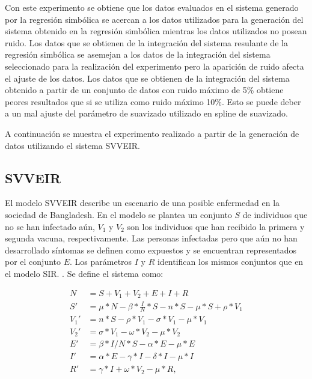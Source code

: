Con este experimento se obtiene que los datos evaluados en el sistema generado por la regresión simbólica se acercan a los datos utilizados para la generación del sistema obtenido en la regresión simbólica mientras los datos utilizados no posean ruido. Los datos que se obtienen de la integración del sistema resulante de la regresión simbólica se asemejan a los datos de la integración del sistema seleccionado para la realización del experimento pero la aparición de ruido afecta el ajuste de los datos. Los datos que se obtienen de la integración del sistema obtenido a partir de un conjunto de datos con ruido máximo de 5\% obtiene peores resultados que si se utiliza como ruido máximo 10\%. Esto se puede deber a un mal ajuste del parámetro de suavizado utilizado en spline de suavizado.

A continuación se muestra el experimento realizado a partir de la generación de datos utilizando el sistema SVVEIR.

\subsection{SVVEIR}

El modelo SVVEIR describe un escenario de una posible enfermedad en la sociedad de Bangladesh. En el modelo se plantea un conjunto $S$ de individuos que no se han infectado aún, $V_1$ y $V_2$ son los individuos que han recibido la primera y segunda vacuna, respectivamente. Las personas infectadas pero que aún no han desarrollado síntomas se definen como expuestos y se encuentran representados por el conjunto $E$. Los parámetros $I$ y $R$ identifican los mismos conjuntos que en el modelo SIR. \cite{kuddus2021mathematical}. Se define el sistema como:


\begin{align*}
    N    & = S + V_1 + V_2 + E + I + R                                        \\
    S'   & = \mu * N - \beta * \frac{I}{N} * S - n * S - \mu * S + \rho * V_1 \\
    V_1' & = n * S - \rho * V_1 - \sigma * V_1 - \mu * V_1                    \\
    V_2' & = \sigma * V_1 - \omega * V_2 - \mu * V_2                          \\
    E'   & = \beta * I / N * S - \alpha * E - \mu * E                         \\
    I'   & = \alpha * E - \gamma * I - \delta * I - \mu * I                   \\
    R'   & = \gamma * I + \omega * V_2 - \mu * R,
\end{align*}

